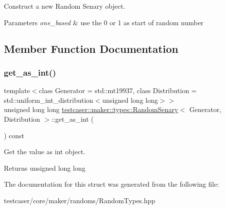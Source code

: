 Construct a new Random Senary object. 


\begin{DoxyParams}{Parameters}
{\em one\+\_\+based} & use the 0 or 1 as start of random number \\
\hline
\end{DoxyParams}


\subsection{Member Function Documentation}
\mbox{\label{structtestcaser_1_1maker_1_1types_1_1RandomSenary_aaa503daedc031aa1e54ddd1db619374c}} 
\subsubsection{\texorpdfstring{get\+\_\+as\+\_\+int()}{get\_as\_int()}}
{\footnotesize\ttfamily template$<$class Generator = std\+::mt19937, class Distribution = std\+::uniform\+\_\+int\+\_\+distribution$<$unsigned long long$>$$>$ \\
unsigned long long \hyperlink{structtestcaser_1_1maker_1_1types_1_1RandomSenary}{testcaser\+::maker\+::types\+::\+Random\+Senary}$<$ Generator, Distribution $>$\+::get\+\_\+as\+\_\+int (\begin{DoxyParamCaption}{ }\end{DoxyParamCaption}) const\hspace{0.3cm}{\ttfamily [inline]}}



Get the value as int object. 

\begin{DoxyReturn}{Returns}
unsigned long long 
\end{DoxyReturn}


The documentation for this struct was generated from the following file\+:\begin{DoxyCompactItemize}
\item 
testcaser/core/maker/randoms/Random\+Types.\+hpp\end{DoxyCompactItemize}
